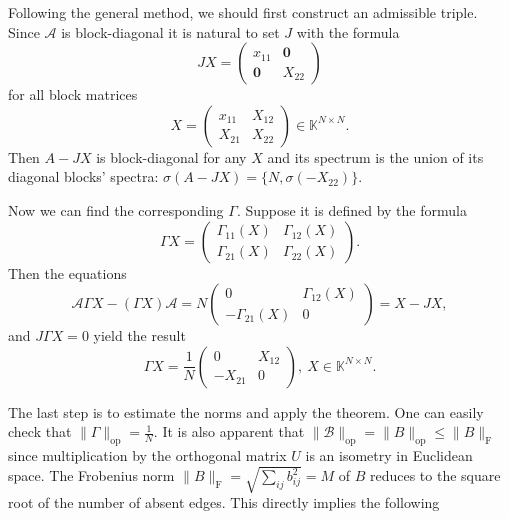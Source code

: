 \documentclass[a4paper]{jpconf}
\begin{document}
Following the general method,
    we should first construct an admissible triple.
Since \( \mathcal{A} \) is block-diagonal
    it is natural to set \( J \) with the formula
    \[
        JX =
        \left(\begin{array}{c|c}
            x_{11} & \mathbf{0} \\ \hline
            \mathbf{0} & X_{22}
        \end{array}\right)
    \]
    for all block matrices
    \[
        X =
        \left(\begin{array}{c|c}
            x_{11} & X_{12} \\ \hline
            X_{21} & X_{22}
        \end{array}\right)\in\mathbb{K}^{N{\times}N}.
    \]
Then \( A - JX \) is block-diagonal for any \( X \)
    and its spectrum is the union
    of its diagonal blocks' spectra:
    \( \sigma(A - JX) = \{N, \sigma(-X_{22}) \} \).

Now we can find the corresponding \( \Gamma \).
Suppose it is defined by the formula
    \[ \Gamma X = \begin{pmatrix}
        \Gamma_{11}(X) & \Gamma_{12}(X) \\
        \Gamma_{21}(X) & \Gamma_{22}(X)
        \end{pmatrix}.
    \]
Then the equations
    \[
        \mathcal{A} \Gamma X - (\Gamma X)\mathcal{A} =
        N
        \begin{pmatrix}
          0 & \Gamma_{12}(X) \\
          -\Gamma_{21}(X) & 0
        \end{pmatrix} = X - JX,
     \]
and \( J\Gamma X = 0 \) yield the result
    \[
        \Gamma X = \frac{1}{N} \begin{pmatrix} 0 & X_{12} \\ -X_{21} & 0 \end{pmatrix},\ X\in\mathbb{K}^{N{\times}N}.
    \]

The last step is to estimate the norms and apply the theorem.
One can easily check that \( \|\Gamma\|_{\mathrm{op}} = \frac1N \).
It is also apparent that \( \|\mathcal{B}\|_{\mathrm{op}} = \|B\|_{\mathrm{op}} \leq \|B\|_{\mathrm{F}} \)
    since multiplication by the orthogonal matrix \( U \)
    is an isometry in Euclidean space.
The Frobenius norm \( {\|B\|_{\mathrm{F}} = \sqrt{\sum_{ij} b_{ij}^2} = M} \)
    of \( B \)
    reduces to the square root of the number of absent edges.
This directly implies the following
\end{document}
